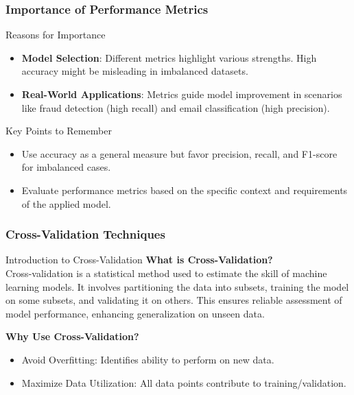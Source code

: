 \documentclass[aspectratio=169]{beamer}
\begin{document}
\begin{frame}[fragile]
    \frametitle{Importance of Performance Metrics}
    \begin{block}{Reasons for Importance}
        \begin{itemize}
            \item \textbf{Model Selection}: Different metrics highlight various strengths. High accuracy might be misleading in imbalanced datasets.
            \item \textbf{Real-World Applications}: Metrics guide model improvement in scenarios like fraud detection (high recall) and email classification (high precision).
        \end{itemize}
    \end{block}
    
    \begin{block}{Key Points to Remember}
        \begin{itemize}
            \item Use accuracy as a general measure but favor precision, recall, and F1-score for imbalanced cases.
            \item Evaluate performance metrics based on the specific context and requirements of the applied model.
        \end{itemize}
    \end{block}    
\end{frame}

\begin{frame}[fragile]
    \frametitle{Cross-Validation Techniques}
    \begin{block}{Introduction to Cross-Validation}
        \textbf{What is Cross-Validation?} \\
        Cross-validation is a statistical method used to estimate the skill of machine learning models. It involves partitioning the data into subsets, training the model on some subsets, and validating it on others. This ensures reliable assessment of model performance, enhancing generalization on unseen data.

        \textbf{Why Use Cross-Validation?}
        \begin{itemize}
            \item Avoid Overfitting: Identifies ability to perform on new data.
            \item Maximize Data Utilization: All data points contribute to training/validation.
        \end{itemize}
    \end{block}
\end{frame}
\end{document}
